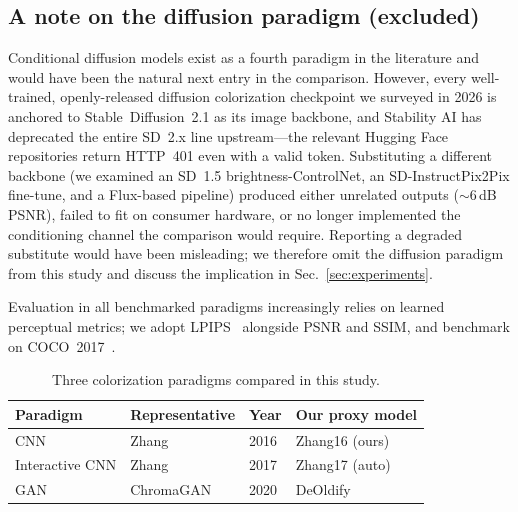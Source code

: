 \subsection{A note on the diffusion paradigm (excluded)}
Conditional diffusion models exist as a fourth paradigm in the literature and
would have been the natural next entry in the comparison. However, every
well-trained, openly-released diffusion colorization checkpoint we surveyed in
2026 is anchored to Stable~Diffusion~2.1 as its image backbone, and Stability
AI has deprecated the entire SD~2.x line upstream---the relevant Hugging Face
repositories return HTTP~401 even with a valid token. Substituting a different
backbone (we examined an SD~1.5 brightness-ControlNet, an SD-InstructPix2Pix
fine-tune, and a Flux-based pipeline) produced either unrelated outputs
(${\sim}6$\,dB PSNR), failed to fit on consumer hardware, or no longer
implemented the conditioning channel the comparison would require. Reporting a
degraded substitute would have been misleading; we therefore omit the
diffusion paradigm from this study and discuss the implication in
Sec.~\ref{sec:experiments}.

\medskip
Evaluation in all benchmarked paradigms increasingly relies on learned
perceptual metrics; we adopt LPIPS~\cite{zhang2018lpips} alongside PSNR and
SSIM, and benchmark on COCO~2017~\cite{lin2014coco}.

\begin{table}[t]
\centering
\caption{Three colorization paradigms compared in this study.}
\label{tab:taxonomy}
\begin{tabular}{@{}llll@{}}
\toprule
Paradigm & Representative & Year & Our proxy model \\
\midrule
CNN              & Zhang~\cite{zhang2016colorful}      & 2016 & Zhang16 (ours) \\
Interactive CNN  & Zhang~\cite{zhang2017realtime}      & 2017 & Zhang17 (auto) \\
GAN              & ChromaGAN~\cite{vitoria2020chromagan} & 2020 & DeOldify \\
\bottomrule
\end{tabular}
\end{table}

